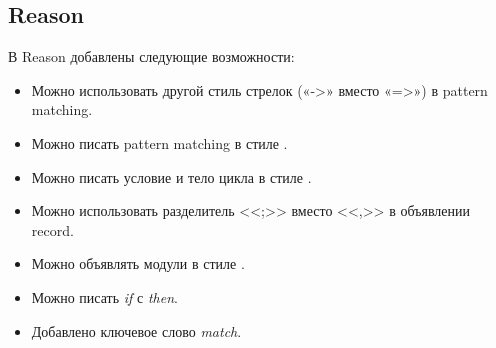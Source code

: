 \subsection{Reason}
В Reason добавлены следующие возможности:
\begin{itemize}

\item Можно использовать другой стиль стрелок («->» вместо «=>») в pattern matching.%

\item Можно писать pattern matching в стиле \OCaml{}.%

\item Можно писать условие и тело цикла в стиле \OCaml{}.

\item Можно использовать разделитель <<;>> вместо <<,>> в объявлении record.

\item Можно объявлять модули в стиле \OCaml{}.

\item Можно писать {\it if} с {\it then}.

\item Добавлено ключевое слово {\it match}.%

\end{itemize}

